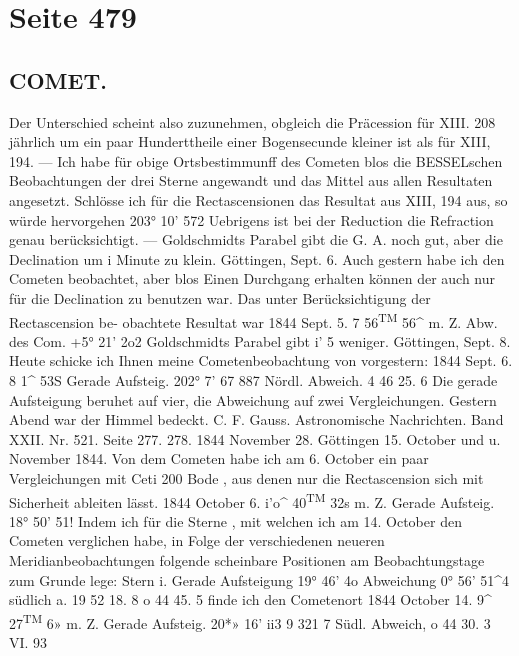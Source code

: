 \documentclass[10pt,a4paper]{article}
\begin{document}
\newpage
\section*{Seite 479}

\subsection*{COMET.}

Der  Unterschied  scheint  also  zuzunehmen,  obgleich  die  Präcession  für  XIII.  208  jährlich  um  ein  paar
Hunderttheile  einer  Bogensecunde  kleiner  ist  als  für  XIII,  194.  ---  Ich  habe  für  obige  Ortsbestimmunff
des  Cometen  blos  die  BESSELschen  Beobachtungen  der  drei  Sterne  angewandt  und  das  Mittel  aus  allen
Resultaten  angesetzt.  Schlösse  ich  für  die  Rectascensionen  das  Resultat  aus  XIII,  194  aus,  so  würde
hervorgehen
203°  10'  57\glqq{}2
Uebrigens  ist  bei  der  Reduction  die  Refraction  genau  berücksichtigt.  ---  Goldschmidts  Parabel  gibt
die  G.  A.  noch  gut,  aber  die  Declination  um  i  Minute  zu  klein.
Göttingen,  Sept.  6.
Auch  gestern  habe  ich    den  Cometen   beobachtet,    aber  blos  Einen  Durchgang  erhalten  können
der  auch  nur  für  die  Declination  zu  benutzen  war.      Das   unter  Berücksichtigung  der  Rectascension  be-
obachtete Resultat  war
1844  Sept.  5.     7\glqq{}  56\textsuperscript{TM}  56\textasciicircum{}  m.  Z.        Abw.  des  Com.  +5°  21'  2o\glqq{}2
Goldschmidts  Parabel  gibt   i'  5\glqq{}   weniger.
Göttingen,  Sept.  8.
Heute  schicke  ich  Ihnen  meine  Cometenbeobachtung  von  vorgestern:
1844  Sept.  6.     8\glqq{}  1\textasciicircum{}  53S        Gerade  Aufsteig.  202°    7'     6\glqq{}7
887  Nördl.  Abweich.       4    46     25. 6
Die  gerade  Aufsteigung  beruhet  auf  vier,  die  Abweichung  auf  zwei  Vergleichungen.
Gestern  Abend  war  der  Himmel  bedeckt.
C.  F.  Gauss.
Astronomische  Nachrichten.    Band  XXII.  Nr.  521.  Seite  277.  278.     1844  November  28.
Göttingen  15.  October  und  u.  November  1844.
Von  dem  Cometen  habe  ich  am  6.  October  ein  paar  Vergleichungen  mit  Ceti  200  Bode  ,  aus  denen
nur  die  Rectascension  sich  mit  Sicherheit  ableiten  lässt.
1844  October  6.    i'o\textasciicircum{}  40\textsuperscript{TM}  32s  m.  Z.        Gerade  Aufsteig.  18°  50'  51\glqq{}!
Indem  ich  für  die  Sterne ,  mit  welchen  ich  am  14.  October  den  Cometen  verglichen  habe,  in  Folge
der  verschiedenen  neueren  Meridianbeobachtungen  folgende  scheinbare  Positionen  am  Beobachtungstage
zum  Grunde  lege:
Stern  i.  Gerade  Aufsteigung  19°  46'     4\glqq{}o        Abweichung  0°  56'    51\textasciicircum{}4  südlich
a.  19     52     18. 8  o     44     45. 5
finde  ich  den  Cometenort
1844  October  14.    9\textasciicircum{}  27\textsuperscript{TM}  6»  m.  Z.        Gerade  Aufsteig.  20*»  16'    ii\glqq{}3
9    321    7  Südl.  Abweich,      o    44    30. 3
VI.  93
\end{document}
